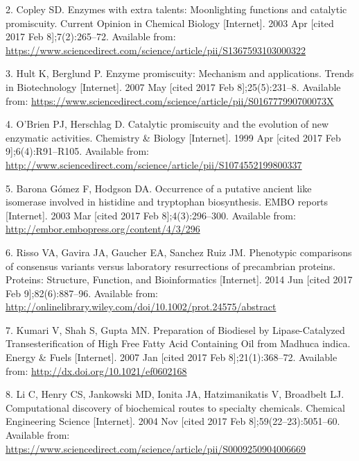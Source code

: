 \documentclass[12pt,twoside]{reedthesis}
\begin{document}
  \hypertarget{ref-copley_enzymes_2003}{}
  2. Copley SD. Enzymes with extra talents: Moonlighting functions and
  catalytic promiscuity. Current Opinion in Chemical Biology
  {[}Internet{]}. 2003 Apr {[}cited 2017 Feb 8{]};7(2):265--72. Available
  from:
  \url{https://www.sciencedirect.com/science/article/pii/S1367593103000322}
  
  \hypertarget{ref-hult_enzyme_2007}{}
  3. Hult K, Berglund P. Enzyme promiscuity: Mechanism and applications.
  Trends in Biotechnology {[}Internet{]}. 2007 May {[}cited 2017 Feb
  8{]};25(5):231--8. Available from:
  \url{https://www.sciencedirect.com/science/article/pii/S016777990700073X}
  
  \hypertarget{ref-obrien_catalytic_1999}{}
  4. O'Brien PJ, Herschlag D. Catalytic promiscuity and the evolution of
  new enzymatic activities. Chemistry \& Biology {[}Internet{]}. 1999 Apr
  {[}cited 2017 Feb 9{]};6(4):R91--R105. Available from:
  \url{http://www.sciencedirect.com/science/article/pii/S1074552199800337}
  
  \hypertarget{ref-baronagomez_occurrence_2003}{}
  5. Barona Gómez F, Hodgson DA. Occurrence of a putative ancient like
  isomerase involved in histidine and tryptophan biosynthesis. EMBO
  reports {[}Internet{]}. 2003 Mar {[}cited 2017 Feb 8{]};4(3):296--300.
  Available from: \url{http://embor.embopress.org/content/4/3/296}
  
  \hypertarget{ref-risso_phenotypic_2014}{}
  6. Risso VA, Gavira JA, Gaucher EA, Sanchez Ruiz JM. Phenotypic
  comparisons of consensus variants versus laboratory resurrections of
  precambrian proteins. Proteins: Structure, Function, and Bioinformatics
  {[}Internet{]}. 2014 Jun {[}cited 2017 Feb 9{]};82(6):887--96. Available
  from:
  \url{http://onlinelibrary.wiley.com/doi/10.1002/prot.24575/abstract}
  
  \hypertarget{ref-kumari_preparation_2007}{}
  7. Kumari V, Shah S, Gupta MN. Preparation of Biodiesel by
  Lipase-Catalyzed Transesterification of High Free Fatty Acid Containing
  Oil from Madhuca indica. Energy \& Fuels {[}Internet{]}. 2007 Jan
  {[}cited 2017 Feb 8{]};21(1):368--72. Available from:
  \url{http://dx.doi.org/10.1021/ef0602168}
  
  \hypertarget{ref-li_computational_2004}{}
  8. Li C, Henry CS, Jankowski MD, Ionita JA, Hatzimanikatis V, Broadbelt
  LJ. Computational discovery of biochemical routes to specialty
  chemicals. Chemical Engineering Science {[}Internet{]}. 2004 Nov
  {[}cited 2017 Feb 8{]};59(22--23):5051--60. Available from:
  \url{https://www.sciencedirect.com/science/article/pii/S0009250904006669}
  
\end{document}
